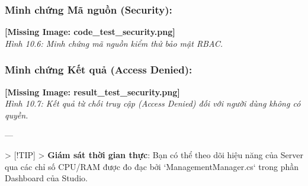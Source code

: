 \subsubsection{Minh chứng Mã nguồn (Security):}
\textbf{[Missing Image: code_test_security.png]}\\ \textit{Hình 10.6: Minh chứng mã nguồn kiểm thử bảo mật RBAC.}

\subsubsection{Minh chứng Kết quả (Access Denied):}
\textbf{[Missing Image: result_test_security.png]}\\ \textit{Hình 10.7: Kết quả từ chối truy cập (Access Denied) đối với người dùng không có quyền.}

---

> [!TIP]
> \textbf{Giám sát thời gian thực}: Bạn có thể theo dõi hiệu năng của Server qua các chỉ số CPU/RAM được đo đạc bởi `ManagementManager.cs` trong phần Dashboard của Studio.

